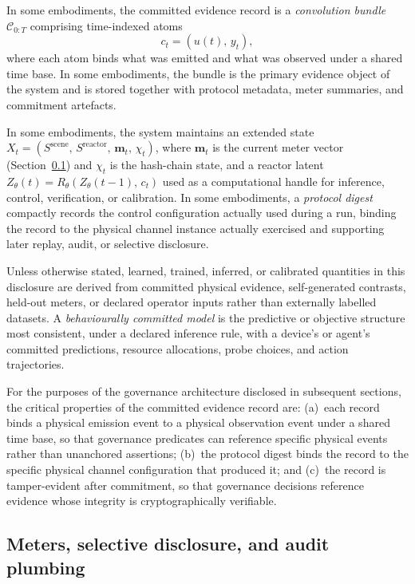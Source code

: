 \documentclass[a4paper,12pt]{article}
\newcommand{\cb}{convolution bundle\xspace}
\begin{document}
In some embodiments, the committed evidence record is a
\emph{\cb} $\mathcal{C}_{0:T}$ comprising time-indexed atoms
\[
  c_t = (u(t),\, y_t),
\]
where each atom binds what was emitted and what was observed under a
shared time base. In some embodiments, the bundle is the primary
evidence object of the system and is stored together with protocol
metadata, meter summaries, and commitment artefacts.

In some embodiments, the system maintains an extended state
$X_t = (S^{\mathrm{scene}},\, S^{\mathrm{reactor}},\, \mathbf{m}_t,\, \chi_t)$,
where $\mathbf{m}_t$ is the current meter vector (Section~\ref{sec:meters-audit})
and $\chi_t$ is the hash-chain state,
and a reactor latent
$Z_{\theta}(t) = R_{\theta}(Z_{\theta}(t-1),\, c_t)$ used as a
computational handle for inference, control, verification, or
calibration. In some embodiments, a \emph{protocol digest} compactly
records the control configuration actually used during a run, binding
the record to the physical channel instance actually exercised and
supporting later replay, audit, or selective disclosure.

Unless otherwise stated, learned, trained, inferred, or calibrated
quantities in this disclosure are derived from committed physical
evidence, self-generated contrasts, held-out meters, or declared
operator inputs rather than externally labelled datasets. A
\emph{behaviourally committed model} is the predictive or objective
structure most consistent, under a declared inference rule, with a
device's or agent's committed predictions, resource allocations, probe
choices, and action trajectories.

For the purposes of the governance architecture disclosed in subsequent
sections, the critical properties of the committed evidence record are:
(a)~each record binds a physical emission event to a physical
observation event under a shared time base, so that governance
predicates can reference specific physical events rather than
unanchored assertions; (b)~the protocol digest binds the record to the
specific physical channel configuration that produced it; and (c)~the
record is tamper-evident after commitment, so that governance decisions
reference evidence whose integrity is cryptographically verifiable.

\subsection{Meters, selective disclosure, and audit plumbing}
\label{sec:meters-audit}
\end{document}
